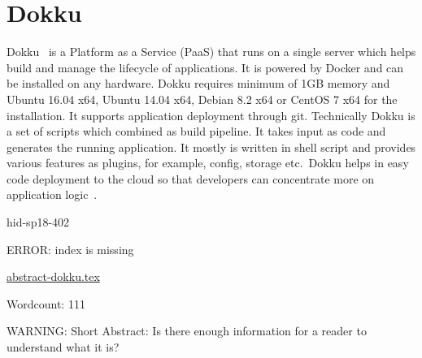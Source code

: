 \section{Dokku}
Dokku~\cite{hid-sp18-402-www-dokku} is a Platform as a Service (PaaS)
that runs on a single server which helps build and manage the
lifecycle of applications. It is powered by Docker and can be
installed on any hardware. Dokku requires minimum of 1GB memory and
Ubuntu 16.04 x64, Ubuntu 14.04 x64, Debian 8.2 x64 or CentOS 7 x64 for
the installation. It supports application deployment through
git. Technically Dokku is a set of scripts which combined as build
pipeline. It takes input as code and generates the running application. It
mostly is written in shell script and provides various features as
plugins, for example, config, storage etc.\ Dokku helps in easy code
deployment to the cloud so that developers can concentrate more on
application logic~\cite{hid-sp18-402-www-dokkuG}.


\begin{IU}

hid-sp18-402

ERROR: index is missing

\href{https://github.com/cloudmesh-community/hid-sp18-402/blob/master//technology/abstract-dokku.tex}{abstract-dokku.tex}

 

Wordcount: 111

WARNING: Short Abstract: Is there enough information for a reader to understand what it is?

\end{IU}

